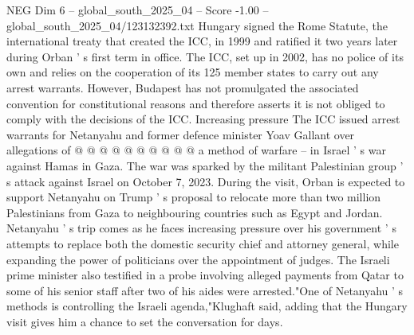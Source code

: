 \begin{textsample}{NEG Dim 6 – global\_south\_2025\_04 – Score -1.00 – global\_south\_2025\_04/123132392.txt}
Hungary signed the Rome Statute, the international treaty that created the ICC, in 1999 and ratified it two years later during Orban ' s first term in office.
The ICC, set up in 2002, has no police of its own and relies on the cooperation of its 125 member states to carry out any arrest warrants.
However, Budapest has not promulgated the associated convention for constitutional reasons and therefore asserts it is not obliged to comply with the decisions of the ICC.
Increasing pressure The ICC issued arrest warrants for Netanyahu and former defence minister Yoav Gallant over allegations of @ @ @ @ @ @ @ @ @ @ a method of warfare -- in Israel ' s war against Hamas in Gaza.
The war was sparked by the militant Palestinian group ' s attack against Israel on October 7, 2023.
During the visit, Orban is expected to support Netanyahu on Trump ' s proposal to relocate more than two million Palestinians from Gaza to neighbouring countries such as Egypt and Jordan.
Netanyahu ' s trip comes as he faces increasing pressure over his government ' s attempts to replace both the domestic security chief and attorney general, while expanding the power of politicians over the appointment of judges.
The Israeli prime minister also testified in a probe involving alleged payments from Qatar to some of his senior staff after two of his aides were arrested."One of Netanyahu ' s methods is controlling the Israeli agenda,"Klughaft said, adding that the Hungary visit gives him a chance to set the conversation for days.

\end{textsample}
